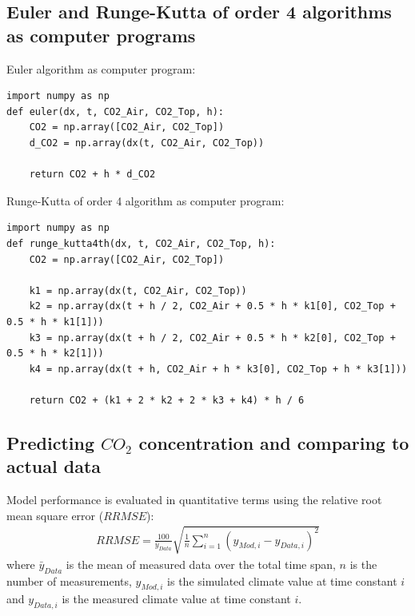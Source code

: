 \documentclass[a4paper]{article}
\newcommand*\mean[1]{\bar{#1}}
\begin{document}
\subsection{Euler and Runge-Kutta of order 4 algorithms as computer programs}
Euler algorithm as computer program:
\begin{mdframed}[leftline=false,rightline=false,backgroundcolor=magenta!10,nobreak=true]
  \begin{verbatim}
import numpy as np
def euler(dx, t, CO2_Air, CO2_Top, h):
    CO2 = np.array([CO2_Air, CO2_Top])
    d_CO2 = np.array(dx(t, CO2_Air, CO2_Top))

    return CO2 + h * d_CO2
  \end{verbatim}
\end{mdframed}

Runge-Kutta of order 4 algorithm as computer program:
\begin{mdframed}[leftline=false,rightline=false,backgroundcolor=magenta!10,nobreak=true]
  \begin{verbatim}
import numpy as np
def runge_kutta4th(dx, t, CO2_Air, CO2_Top, h):
    CO2 = np.array([CO2_Air, CO2_Top])

    k1 = np.array(dx(t, CO2_Air, CO2_Top))
    k2 = np.array(dx(t + h / 2, CO2_Air + 0.5 * h * k1[0], CO2_Top + 0.5 * h * k1[1]))
    k3 = np.array(dx(t + h / 2, CO2_Air + 0.5 * h * k2[0], CO2_Top + 0.5 * h * k2[1]))
    k4 = np.array(dx(t + h, CO2_Air + h * k3[0], CO2_Top + h * k3[1]))

    return CO2 + (k1 + 2 * k2 + 2 * k3 + k4) * h / 6
  \end{verbatim}
\end{mdframed}

\subsection{Predicting \texorpdfstring{\(CO_2\)}{} concentration and comparing to actual data}

Model performance is evaluated in quantitative terms using the relative root mean square error (\(RRMSE\))\cite{kobayashi2000comparing}:
\begin{align}
  \label{eq:rrmse}
  RRMSE = \frac{100}{\mean{y}_{Data}} \sqrt{\frac{1}{n} \sum_{i=1}^{n} {\left(y_{Mod,i} - y_{Data,i}\right)}^2}
\end{align}
where \(\mean{y}_{Data}\) is the mean of measured data over the total time span, \(n\) is the number of measurements, \(y_{Mod,i}\) is the simulated climate value at time constant \(i\) and \(y_{Data,i}\) is the measured climate value at time constant \(i\).
\end{document}
